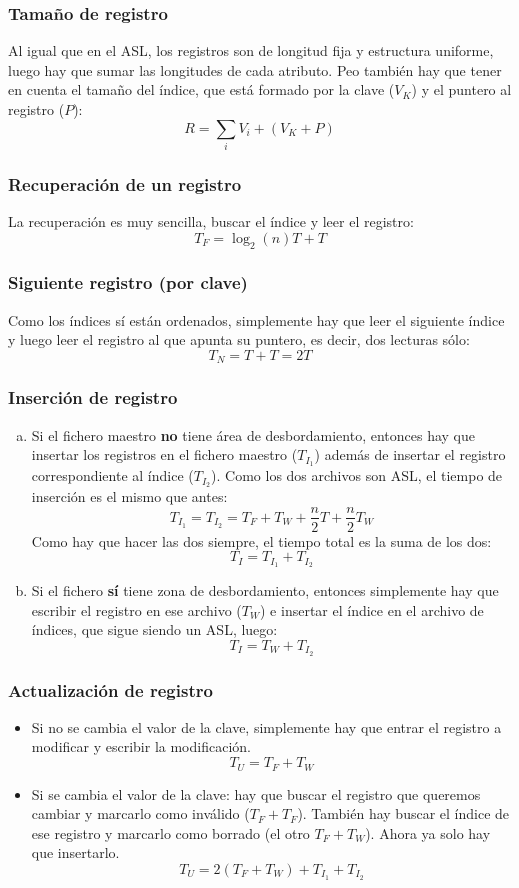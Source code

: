 \subsubsection{Tamaño de registro}
Al igual que en el ASL, los registros son de longitud fija y estructura uniforme, luego hay que sumar las longitudes de cada atributo. Peo también hay que tener en cuenta el tamaño del índice, que está formado por la clave ($V_K$) y el puntero al registro ($P$):
\[
R=\sum_iV_i + (V_K+P)
\]
\subsubsection{Recuperación de un registro}
La recuperación es muy sencilla, buscar el índice y leer el registro:
\[
T_F=\log_2(n)T+T
\]
\subsubsection{Siguiente registro (por clave)}
Como los índices sí están ordenados, simplemente hay que leer el siguiente índice y luego leer el registro al que apunta su puntero, es decir, dos lecturas sólo:
\[
T_N=T+T=2T
\]
\subsubsection{Inserción de registro}

\begin{enumerate}[(a)]
\item Si el fichero maestro \textbf{no} tiene área de desbordamiento, entonces hay que insertar los registros en el fichero maestro ($T_{I_1}$) además de insertar el registro correspondiente al índice ($T_{I_2}$). Como los dos archivos son ASL, el tiempo de inserción es el mismo que antes:
\[
T_{I_1}=T_{I_2}=T_F+T_W+\frac{n}{2}T+\frac{n}{2}T_W
\]
Como hay que hacer las dos siempre, el tiempo total es la suma de los dos:
\[
T_I=T_{I_1}+T_{I_2}
\]
\item Si el fichero \textbf{sí} tiene zona de desbordamiento, entonces simplemente hay que escribir el registro en ese archivo ($T_W$) e insertar el índice en el archivo de índices, que sigue siendo un ASL, luego:
\[
T_I=T_W+T_{I_2}
\]
\end{enumerate}
\subsubsection{Actualización de registro}

\begin{itemize}[(a)]
\item Si no se cambia el valor de la clave, simplemente hay que entrar el registro a modificar y escribir la modificación.
\[
T_U=T_F+T_W
\]
\item Si se cambia el valor de la clave: hay que buscar el registro que queremos cambiar y marcarlo como inválido ($T_F+T_F$). También hay buscar el índice de ese registro y marcarlo como borrado (el otro $T_F+T_W$). Ahora ya solo hay que insertarlo.
\[
T_U=2(T_F+T_W)+T_{I_1}+T_{I_2}
\]
\end{itemize}

